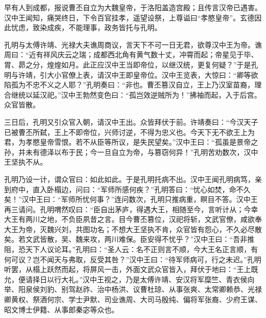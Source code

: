 早有人到成都，报说曹丕自立为大魏皇帝，于洛阳盖造宫殿；且传言汉帝已遇害。汉中王闻知，痛哭终日，下令百官挂孝，遥望设祭，上尊谥曰“孝愍皇帝”。玄德因此忧虑，致染成疾，不能理事，政务皆托与孔明。

孔明与太傅许靖、光禄大夫谯周商议，言天下不可一日无君，欲尊汉中王为帝。谯周曰：“近有祥风庆云之瑞；成都西北角有黄气数十丈，冲霄而起；帝星见于毕、胃、昴之分，煌煌如月。此正应汉中王当即帝位，以继汉统，更复何疑？”于是孔明与许靖，引大小官僚上表，请汉中王即皇帝位。汉中王览表，大惊曰：“卿等欲陷孤为不忠不义之人耶？”孔明奏曰：“非也。曹丕篡汉自立，王上乃汉室苗裔，理合继统以延汉祀。”汉中王勃然变色曰：“孤岂效逆贼所为！”拂袖而起，入于后宫。众官皆散。

三日后，孔明又引众官入朝，请汉中王出。众皆拜伏于前。许靖奏曰：“今汉天子已被曹丕所弑，王上不即帝位，兴师讨逆，不得为忠义也。今天下无不欲王上为君，为孝愍皇帝雪恨。若不从臣等所议，是失民望矣。”汉中王曰：“孤虽是景帝之孙，并未有德泽以布于民；今一旦自立为帝，与篡窃何异！”孔明苦劝数次，汉中王坚执不从。

孔明乃设一计，谓众官曰：如此如此。于是孔明托病不出。汉中王闻孔明病笃，亲到府中，直入卧榻边，问曰：“军师所感何疾？”孔明答曰：“忧心如焚，命不久矣！”汉中王曰：“军师所忧何事？”连问数次，孔明只推病重，瞑目不答。汉中王再三请问。孔明喟然叹曰：“臣自出茅庐，得遇大王，相随至今，言听计从；今幸大王有两川之地，不负臣夙昔之言。目今曹丕篡位，汉祀将斩，文武官僚，咸欲奉大王为帝，灭魏兴刘，共图功名；不想大王坚执不肯，众官皆有怨心，不久必尽散矣。若文武皆散，吴、魏来攻，两川难保。臣安得不忧乎？”汉中王曰：“吾非推阻，恐天下人议论耳。”孔明曰：“圣人云：名不正则言不顺，今大王名正言顺，有何可议？岂不闻天与弗取，反受其咎？”汉中王曰：“待军师病可，行之未迟。”孔明听罢，从榻上跃然而起，将屏风一击，外面文武众官皆入，拜伏于地曰：“王上既允，便请择日以行大礼。”汉中王视之，乃是太傅许靖、安汉将军糜竺、青衣侯向举、阳泉侯刘豹、别驾赵祚、治中杨洪、议曹杜琼、从事张爽、太常卿赖恭、光禄卿黄权、祭酒何宗、学士尹默、司业谯周、大司马殷纯、偏将军张裔、少府王谋、昭文博士伊籍、从事郎秦宓等众也。

